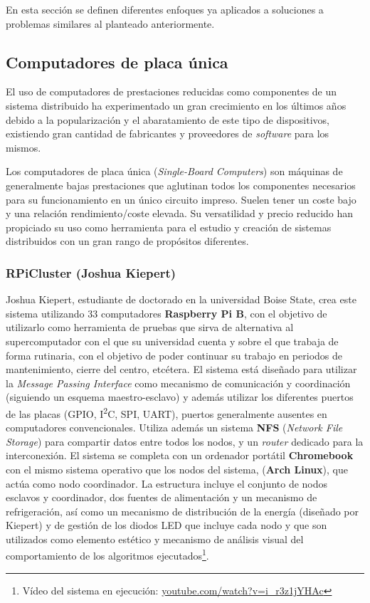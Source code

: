 En esta sección se definen diferentes enfoques ya aplicados a soluciones a problemas similares al planteado anteriormente.

\subsection{Computadores de placa única}

El uso de computadores de prestaciones reducidas como componentes de un sistema distribuido ha experimentado un gran crecimiento en los últimos años debido a la popularización y el abaratamiento de este tipo de dispositivos, existiendo gran cantidad de fabricantes y proveedores de \textit{software} para los mismos.

Los computadores de placa única (\textit{Single-Board Computers}) son máquinas de generalmente bajas prestaciones que aglutinan todos los componentes necesarios para su funcionamiento en un único circuito impreso. Suelen tener un coste bajo y una relación rendimiento/coste elevada. Su versatilidad y precio reducido han propiciado su uso como herramienta para el estudio y creación de sistemas distribuidos con un gran rango de propósitos diferentes.

\subsubsection{RPiCluster (Joshua Kiepert)}

Joshua Kiepert, estudiante de doctorado en la universidad Boise State, crea este sistema utilizando 33 computadores \textbf{Raspberry Pi B}, con el objetivo de utilizarlo como herramienta de pruebas que sirva de alternativa al supercomputador con el que su universidad cuenta\cite{joshuarpicluster} y sobre el que trabaja de forma rutinaria, con el objetivo de poder continuar su trabajo en periodos de mantenimiento, cierre del centro, etcétera. El sistema está diseñado para utilizar la \textit{Message Passing Interface} como mecanismo de comunicación y coordinación (siguiendo un esquema maestro-esclavo) y además utilizar los diferentes puertos de las placas (GPIO, I\textsuperscript{2}C, SPI, UART), puertos generalmente ausentes en computadores convencionales. Utiliza además un sistema \textbf{NFS} (\textit{Network File Storage}) para compartir datos entre todos los nodos, y un \textit{router} dedicado para la interconexión. El sistema se completa con un ordenador portátil \textbf{Chromebook} con el mismo sistema operativo que los nodos del sistema, (\textbf{Arch Linux}), que actúa como nodo coordinador. La estructura incluye el conjunto de nodos esclavos y coordinador, dos fuentes de alimentación y un mecanismo de refrigeración, así como un mecanismo de distribución de la energía (diseñado por Kiepert) y de gestión de los diodos LED que incluye cada nodo y que son utilizados como elemento estético y mecanismo de análisis visual del comportamiento de los algoritmos ejecutados\footnote{Vídeo del sistema en ejecución: \href{https://www.youtube.com/watch?v=i_r3z1jYHAc}{youtube.com/watch?v=i\_r3z1jYHAc}}.

